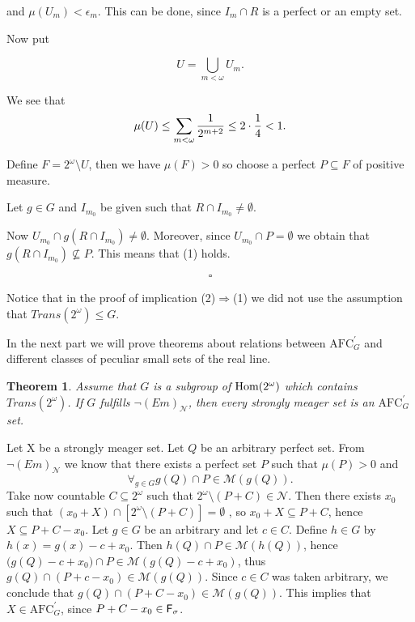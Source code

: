 \documentclass[b5cutpaper, twoside, 11pt, leqno]{moravica}
\newcommand{\eps}{\epsilon}
\newcommand{\afc}{\mathrm{AFC}}
\newcommand{\afcp}{\afc^\prime}
\newcommand\afcg{\afcp_{G}}
\newcommand\trans{\mathit{Trans}(\ca)}
\newcommand{\seq}{\subseteq}
\newcommand{\ca}{2^{\omega}}
\newcommand{\mgr}{\mathcal{M}}
\newcommand{\neglig}{\mathcal{N}}
\newcommand{\fsigma}{{\sf F}_{\sigma}}
\newcommand{\cantor}{\ca}
\newcommand\Hom{{\rm Hom(\ca)}}
\newtheorem{theorem}{Theorem}[section]
\theoremstyle{definition}
\begin{document}
and $\mu(U_{m}) < \eps_{m}$.
This can be done, since
$I_m \cap R$ is a perfect or an empty set.

Now put

\[ U = \bigcup_{m < \omega} U_m. \]

We see that
\[
\mu(U) \leq \sum_{m < \omega}
{1 \over 2^{m + 2}} \leq 2 \cdot {1 \over 4} < 1.
\]

Define $F = \cantor \setminus U$, then we have
$\mu(F) > 0$
so choose a perfect $P \seq F$ of positive
measure.

  Let $g \in G$ and $I_{m_0}$ be given such that
$R \cap I_{m_0} \not = \emptyset$.

Now $U_{m_0} \cap g(R \cap I_{m_0}) \not = \emptyset$.
Moreover, since
$U_{m_0} \cap P = \emptyset$
we obtain that $g(R \cap I_{m_0}) \not \seq P$.
This means that (1) holds.

  \[ \square \]

Notice that in the proof of implication (2)$\Rightarrow$(1)
we did not use the assumption that
$\trans \leq G$.

\bigskip

  In the next part we will prove theorems about relations between
$\afcg$ and different classes of peculiar small sets of the real line.

\begin{theorem}
\label{-em=>N}
  Assume that $G$ is a subgroup
of $\Hom$ which contains $\trans$.
  If $G$ fulfills $\neg (Em)_{\neglig}$,
then every strongly meager set is an $\afcg$ set.
\end{theorem}

\proof

Let X be a strongly meager set.
Let $Q$ be an arbitrary perfect set.
From $\neg (Em)_{\neglig}$ we know that there exists a perfect
set $P$ such that $\mu (P) > 0$ and
  \[ \forall_{g \in G} g(Q) \cap P \in \mgr(g(Q)). \]
Take now countable $C \seq \cantor $ such that
$\cantor \setminus (P + C) \in \neglig$.
  Then there exists $x_0$ such that $(x_0 +X) \cap
[ \cantor \setminus (P + C) ] = \emptyset $ ,
so $x_0 + X \seq P + C$, hence $X \seq P + C - x_0$.
  Let $g \in G$ be an arbitrary and let $c \in C$.
Define $h \in G$ by $h(x) = g(x) - c + x_0$.
  Then $h(Q) \cap P \in \mgr(h(Q))$, hence
$\big( g(Q) - c + x_0\big) \cap P \in \mgr(g(Q) - c + x_0)$,
thus $g(Q) \cap (P + c - x_0) \in \mgr(g(Q))$.
  Since $c \in C$ was taken arbitrary, we conclude that
$g(Q) \cap (P + C - x_0) \in \mgr(g(Q))$.
  This implies that $X \in \afcg$, since $P + C - x_0 \in \fsigma$.
\end{document}
